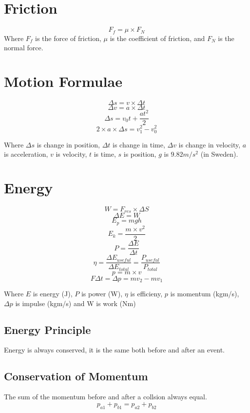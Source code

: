 \documentclass[12pt]{article}
\begin{document}
\section*{Friction}
	\begin{multicols}{2}
		\[F_{f} = \mu \times F_{N}\] \break
		Where $F_f$ is the force of friction, $\mu$ is the coefficient of friction, and $F_N$ is the normal force.
	\end{multicols}

\section*{Motion Formulae}
	\begin{multicols}{2}
		\[\Delta s = v \times \Delta t\]
		\[\Delta v = a \times \Delta t\]
		\[\Delta s = v_0 t + \frac{at^2}{2}\]
		\[2 \times a \times \Delta s = v_{1}^2 - v_{0}^2\]
	\end{multicols}
	Where $\Delta s$ is change in position, $\Delta t$ is change in time, $\Delta v$ is change in velocity, $a$ is acceleration, $v$ is velocity, $t$ is time, $s$ is position, $g$ is $9.82 m/s^2$ (in Sweden).
\section*{Energy}
	\begin{multicols}{2}
		\[W = F_{res} \times \Delta S\]
		\[\Delta E = W\]
		\[E_{p} = m g h\]
		\[E_{k} = \frac{m \times v ^2}{2}\]
		\[P = \frac{\Delta E}{\Delta t}\]
		\[\eta = \frac{\Delta E_{useful}}{\Delta E_{total}}= \frac{P_{useful}}{P_{total}} \]
		\[p = m \times v\]
		\[F \Delta t = \Delta p = mv_{2} - mv_{1}\]
	\end{multicols}
	Where $E$ is energy (J), $P$ is power (W), $\eta$ is efficieny, $p$ is momentum (kgm/s), $\Delta p$ is impulse (kgm/s) and W is work (Nm)
	\begin{multicols}{2}
		\subsection*{Energy Principle}
			Energy is always conserved, it is the same both before and after an event. \newline \break
		\subsection*{Conservation of Momentum}
			The sum of the momentum before and after a collsion always equal.
			\[p_{a1} + p_{b1} = p_{a2} + p_{b2}\]
	\end{multicols}
\end{document}
